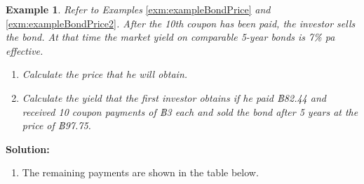 \documentclass[
]{book}
\providecommand{\tightlist}{%
  \setlength{\itemsep}{0pt}\setlength{\parskip}{0pt}}
\theoremstyle{definition}
\theoremstyle{definition}
\newtheorem{example}{Example}[chapter]
\theoremstyle{definition}
\theoremstyle{definition}
\theoremstyle{remark}
\begin{document}
\begin{example}

\emph{Refer to Examples} \ref{exm:exampleBondPrice} \emph{and}
\ref{exm:exampleBondPrice2}\emph{. After the 10th coupon has been paid, the
investor sells the bond. At that time the market yield on comparable
5-year bonds is 7\% pa effective.}

\begin{enumerate}
\def\labelenumi{\arabic{enumi}.}
\item
  \emph{Calculate the price that he will obtain.}
\item
  \emph{Calculate the yield that the first investor obtains if he paid
  ฿82.44 and received 10 coupon payments of ฿3 each and sold the bond
  after 5 years at the price of ฿97.75.}
\end{enumerate}

\end{example}

\textbf{Solution:}

\begin{enumerate}
\def\labelenumi{\arabic{enumi}.}
\tightlist
\item
  The remaining payments are shown in the table below.
\end{enumerate}
\end{document}
